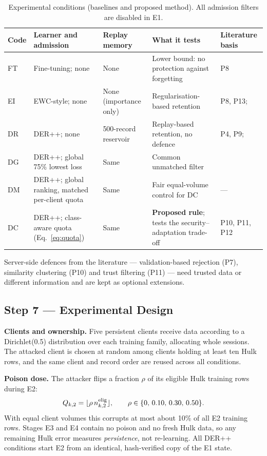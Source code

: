 \documentclass[10pt,a4paper]{article}
\begin{document}
\begin{table}[htbp]
\centering\footnotesize
\caption{Experimental conditions (baselines and proposed method). All admission filters are disabled in E1.}
\label{tab:arms}
\begin{tabularx}{\linewidth}{L{0.9cm}L{3.4cm}L{3.0cm}Y L{2.4cm}}
\toprule
Code & Learner and admission & Replay memory & What it tests & Literature basis\\
\midrule
FT & Fine-tuning; none & None & Lower bound: no protection against forgetting & P8\\
EI & EWC-style; none & None (importance only) & Regularisation-based retention & P8, P13; \cite{ewc}\\
DR & DER++; none & 500-record reservoir & Replay-based retention, no defence & P4, P9; \cite{der}\\
DG & DER++; global 75\% lowest loss & Same & Common unmatched filter & \cite{coteach}\\
DM & DER++; global ranking, matched per-client quota & Same & Fair equal-volume control for DC & ---\\
DC & DER++; class-aware quota (Eq.~\ref{eq:quota}) & Same & \textbf{Proposed rule}; tests the security--adaptation trade-off & P10, P11, P12\\
\bottomrule
\end{tabularx}
\end{table}
Server-side defences from the literature --- validation-based rejection (P7), similarity clustering (P10) and trust filtering (P11) --- need trusted data or different information and are kept as optional extensions.

\subsection{Step 7 --- Experimental Design}
\textbf{Clients and ownership.} Five persistent clients receive data according to a Dirichlet(0.5) distribution over each training family, allocating whole sessions. The attacked client is chosen at random among clients holding at least ten Hulk rows, and the same client and record order are reused across all conditions.

\textbf{Poison dose.} The attacker flips a fraction $\rho$ of its eligible Hulk training rows during E2:
\begin{equation}
Q_{k,2}=\lfloor\rho\, n^{\rm elig}_{k,2}\rfloor,\qquad \rho\in\{0,\,0.10,\,0.30,\,0.50\}.
\label{eq:dose}
\end{equation}
With equal client volumes this corrupts at most about 10\% of all E2 training rows. Stages E3 and E4 contain no poison and no fresh Hulk data, so any remaining Hulk error measures \emph{persistence}, not re-learning. All DER++ conditions start E2 from an identical, hash-verified copy of the E1 state.
\end{document}
